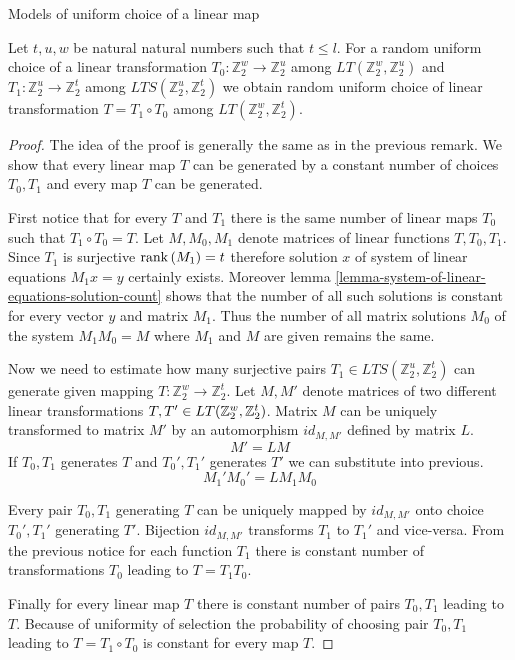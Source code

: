 \begin{section}{Models of uniform choice of a linear map}
\begin{remark}
\label{remark-model-uniform-linear-map-selection}
Let $t, u, w$ be natural natural numbers such that $t \leq l$. For a random uniform choice of a linear transformation $T_0: \mathbb{Z}_2^w \rightarrow \mathbb{Z}_2^u$ among $LT(\mathbb{Z}_2^w, \mathbb{Z}_2^u)$ and $T_1: \mathbb{Z}_2^u \rightarrow \mathbb{Z}_2^t$ among $LTS(\mathbb{Z}_2^u, \mathbb{Z}_2^t)$ we obtain random uniform choice of linear transformation $T = T_1 \circ T_0$ among $LT(\mathbb{Z}_2^w, \mathbb{Z}_2^t)$.
\end{remark}
\begin{proof}
The idea of the proof is generally the same as in the previous remark. We show that every linear map $T$ can be generated by a constant number of choices $T_0, T_1$ and every map $T$ can be generated.

First notice that for every $T$ and $T_1$ there is the same number of linear maps $T_0$ such that $T_1 \circ T_0 = T$. Let $M, M_0, M_1$ denote matrices of linear functions $T, T_0, T_1$. Since $T_1$ is surjective $\mathrm{rank}\left({M_1}\right) = t$ therefore solution $x$ of system of linear equations $M_1 x = y$ certainly exists. Moreover lemma \ref{lemma-system-of-linear-equations-solution-count} shows that the number of all such solutions is constant for every vector $y$ and matrix $M_1$. Thus the number of all matrix solutions $M_0$ of the system $M_1 M_0 = M$ where $M_1$ and $M$ are given remains the same.

Now we need to estimate how many surjective pairs $T_1 \in LTS(\mathbb{Z}_2^u, \mathbb{Z}_2^t)$ can generate given mapping $T: \mathbb{Z}_2^w \rightarrow \mathbb{Z}_2^t$. Let $M, M'$ denote matrices of two different linear transformations $T, T' \in LT(\mathbb{Z}_{2}^{w}, \mathbb{Z}_{2}^{t})$. Matrix $M$ can be uniquely transformed to matrix $M'$ by an automorphism $id_{M, M'}$ defined by matrix $L$.
\[
	M' = LM
\]
If $T_0, T_1$ generates $T$ and $T_0', T_1'$ generates $T'$ we can substitute into previous.
\[
	M_1' M_0' = L M_1 M_0
\]

Every pair $T_0, T_1$ generating $T$ can be uniquely mapped by $id_{M, M'}$ onto choice $T_0', T_1'$ generating $T'$. Bijection $id_{M, M'}$ transforms $T_1$ to $T_1'$ and vice-versa. From the previous notice for each function $T_1$ there is constant number of transformations $T_0$ leading to $T = T_1 T_0$.

Finally for every linear map $T$ there is constant number of pairs $T_0, T_1$ leading to $T$. Because of uniformity of selection the probability of choosing pair $T_0, T_1$ leading to $T = T_1 \circ T_0$ is constant for every map $T$.
\end{proof}


\end{section}
